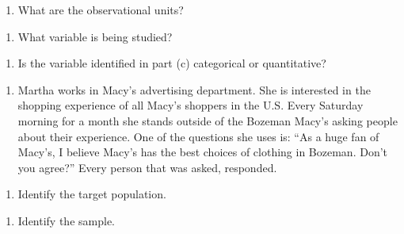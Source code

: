 \documentclass[
]{report}
\providecommand{\tightlist}{%
  \setlength{\itemsep}{0pt}\setlength{\parskip}{0pt}}
\begin{document}
\vspace{0.4in}

\begin{enumerate}
\def\labelenumi{\alph{enumi}.}
\setcounter{enumi}{1}
\tightlist
\item
  What are the observational units?
\end{enumerate}

\vspace{0.4in}

\begin{enumerate}
\def\labelenumi{\alph{enumi}.}
\setcounter{enumi}{2}
\tightlist
\item
  What variable is being studied?
\end{enumerate}

\vspace{0.4in}

\begin{enumerate}
\def\labelenumi{\alph{enumi}.}
\setcounter{enumi}{3}
\tightlist
\item
  Is the variable identified in part (c) categorical or quantitative?
\end{enumerate}

\vspace{0.4in}

\begin{enumerate}
\def\labelenumi{\arabic{enumi}.}
\setcounter{enumi}{1}
\tightlist
\item
  Martha works in Macy's advertising department. She is interested in the shopping experience of all Macy's shoppers in the U.S. Every Saturday morning for a month she stands outside of the Bozeman Macy's asking people about their experience. One of the questions she uses is: ``As a huge fan of Macy's, I believe Macy's has the best choices of clothing in Bozeman. Don't you agree?'' Every person that was asked, responded.
\end{enumerate}

\begin{enumerate}
\def\labelenumi{\alph{enumi}.}
\tightlist
\item
  Identify the target population.
\end{enumerate}

\vspace{0.4in}

\begin{enumerate}
\def\labelenumi{\alph{enumi}.}
\setcounter{enumi}{1}
\tightlist
\item
  Identify the sample.
\end{enumerate}
\end{document}
